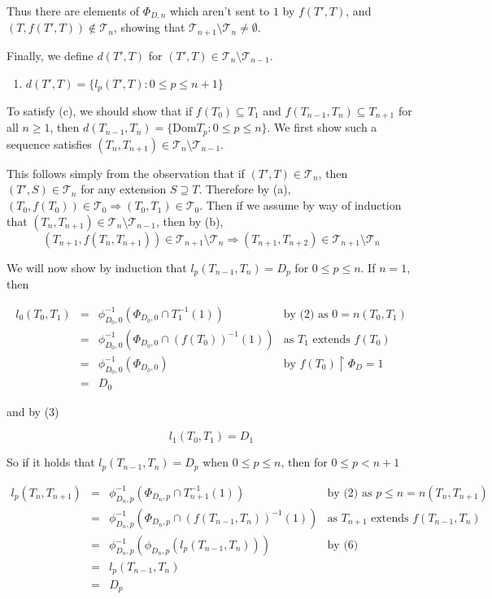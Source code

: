 \documentclass[12pt]{article}
\theoremstyle{plain}
\theoremstyle{definition}
\theoremstyle{remark}
\begin{document}
Thus there are elements of $\Phi_{D,n}$ which aren't sent to $1$ by $f(T',T)$, and $(T,f(T',T))\not\in \mathcal{T}_n$, showing that $\mathcal{T}_{n+1}\setminus \mathcal{T}_n \not= \emptyset$.

Finally, we define $d(T',T)$ for $(T',T) \in \mathcal{T}_n\setminus \mathcal{T}_{n-1}$.

	\begin{enumerate}
	\setcounter{enumi}{0}
	\item $d(T',T)=\{l_p(T',T):0\leq p \leq n+1\}$
	\end{enumerate}
	
To satisfy (c), we should show that if $f(T_0)\subseteq T_1$ and $f(T_{n-1},T_n)\subseteq T_{n+1}$ for all $n\geq 1$, then $d(T_{n-1},T_n)=\{\textrm{Dom} T_p : 0\leq p \leq n\}$. We first show such a sequence satisfies $(T_n,T_{n+1}) \in \mathcal{T}_n\setminus \mathcal{T}_{n-1}$.

This follows simply from the observation that if $(T',T)\in\mathcal{T}_n$, then $(T',S)\in\mathcal{T}_n$ for any extension $S\supseteq T$.  Therefore by (a), $(T_0,f(T_0))\in \mathcal{T}_0 \Rightarrow (T_0,T_1)\in\mathcal{T}_0$. Then if we assume by way of induction that $(T_n,T_{n+1})\in\mathcal{T}_n\setminus\mathcal{T}_{n-1}$, then by (b), \[(T_{n+1},f(T_n,T_{n+1}))\in\mathcal{T}_{n+1}\setminus\mathcal{T}_n \Rightarrow (T_{n+1},T_{n+2})\in\mathcal{T}_{n+1}\setminus\mathcal{T}_n\]

We will now show by induction that $l_p(T_{n-1},T_n)=D_p$ for $0\leq p \leq n$. If $n=1$, then

\[
\begin{array}{rcll}
l_0(T_0,T_1)
& = &
\phi_{D_0,0}^{-1}(\Phi_{D_0,0}\cap T_1^{-1}(1))
&
\text{by (2) as }0 = n(T_0,T_1)
\\ & = &
\phi_{D_0,0}^{-1}(\Phi_{D_0,0}\cap (f(T_0))^{-1}(1))
&
\text{as }T_1\text{ extends }f(T_0)
\\ & = &
\phi_{D_0,0}^{-1}(\Phi_{D_0,0})
&
\text{by }f(T_0)\restriction \Phi_D = 1
\\ & = &
D_0
\end{array}
\]

and by (3)

\[l_1(T_0,T_1)=D_1\]

So if it holds that $l_p(T_{n-1},T_n)=D_p$ when $0\leq p \leq n$, then for $0\leq p < n+1$

\[
\begin{array}{rcll}
l_p(T_n,T_{n+1})
& = &
\phi_{D_n,p}^{-1}(\Phi_{D_n,p}\cap T_{n+1}^{-1}(1))
&
\text{by (2) as } p \leq n = n(T_n,T_{n+1})
\\ & = &
\phi_{D_n,p}^{-1}(\Phi_{D_n,p}\cap (f(T_{n-1},T_n))^{-1}(1))
&
\text{as }T_{n+1}\text{ extends }f(T_{n-1},T_n)
\\ & = &
\phi_{D_n,p}^{-1}(\phi_{D_n,p}(l_p(T_{n-1},T_n)))
&
\text{by (6)}
\\ & = &
l_p(T_{n-1},T_n)
\\ & = &
D_p
\end{array}
\]
\end{document}
